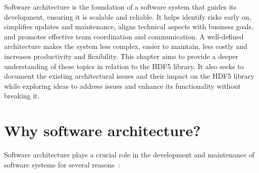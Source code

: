 


Software architecture is the foundation of a software system that guides its development, ensuring it is scalable and reliable. It helps identify risks early on, simplifies updates and maintenance, aligns technical aspects with business goals, and promotes effective team coordination and communication. A well-defined architecture makes the system less complex, easier to maintain, less costly and increases productivity and flexibility. This chapter aims to provide a deeper understanding of these topics in relation to the HDF5 library. It also seeks to document the existing architectural issues and their impact on the HDF5 library while exploring ideas to address issues and enhance its functionality without breaking it.

\section{Why software architecture?}

Software architecture plays a crucial role in the development and maintenance of software systems for several reasons~\cite{openai2023chatgpt}:

